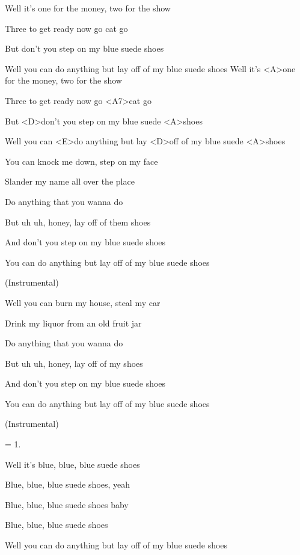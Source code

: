 
\ifdefined\TPBAND
\zs
Well it's one for the money, two for the show

Three to get ready now go cat go

But don't you step on my blue suede shoes

Well you can do anything but lay off of my blue suede shoes
\ks
\else
\zs
Well it's <A>one for the money, two for the show

Three to get ready now go <A7>cat go

But <D>don't you step on my blue suede <A>shoes

Well you can <E>do anything but lay <D>off of my blue suede <A>shoes
\ks
\fi

\zs
You can knock me down, step on my face

Slander my name all over the place

Do anything that you wanna do

But uh uh, honey, lay off of them shoes

And don't you step on my blue suede shoes

You can do anything but lay off of my blue suede shoes
\ks

\zs
(Instrumental)
\ks

\zs
Well you can burn my house, steal my car

Drink my liquor from an old fruit jar

Do anything that you wanna do

But uh uh, honey, lay off of my shoes

And don't you step on my blue suede shoes

You can do anything but lay off of my blue suede shoes
\ks

\zs
(Instrumental)
\ks

\zs
= 1.
\ks

\zs
Well it's blue, blue, blue suede shoes

Blue, blue, blue suede shoes, yeah

Blue, blue, blue suede shoes baby

Blue, blue, blue suede shoes

Well you can do anything but lay off of my blue suede shoes
\ks

\kp
